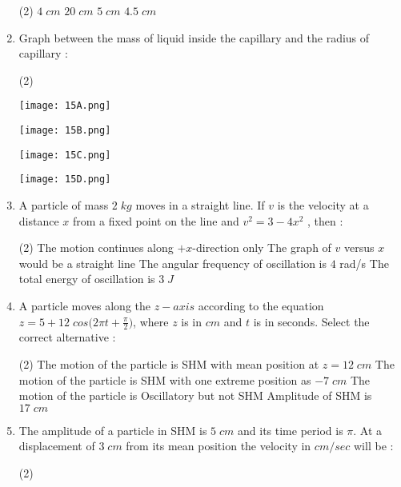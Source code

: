 \documentclass{article}
\begin{document}
\begin{enumerate}
\begin{tasks}(2)
\task \(4\;cm\)
\task \(20\;cm\)
\task \(5\;cm\)
\task \(4.5\; cm\)
\end{tasks}
\item Graph between the mass of liquid inside the capillary and the radius of capillary :
\begin{tasks}(2)
\task \begin{minipage} {0.25\textwidth} \texttt{[image: 15A.png]}\end{minipage}
\task \begin{minipage} {0.25\textwidth} \texttt{[image: 15B.png]}\end{minipage}
\task \begin{minipage} {0.25\textwidth} \texttt{[image: 15C.png]}\end{minipage}
\task \begin{minipage} {0.25\textwidth} \texttt{[image: 15D.png]}\end{minipage}
\end{tasks}
\item A particle of mass \(2\;kg\) moves in a straight line. If \(v\) is the velocity at a distance \(x\) from a fixed point on the line and \(v^2 = 3 - 4 x^2\) , then :
\begin{tasks}(2)
\task The motion continues along \(+x\)-direction only
\task The graph of \(v\) versus \(x\) would be a straight line
\task The angular frequency of oscillation is \(4\) rad/s
\task The total energy of oscillation is \(3\;J\)
\end{tasks}
\item A particle moves along the \(z-axis\) according to the equation \(z=5+12\;cos\biggl(2\pi t + \displaystyle \frac{\pi}{2}\biggl)\), where \(z\) is in \(cm\) and \(t\) is in seconds. Select the correct alternative :
\begin{tasks}(2)
\task The motion of the particle is SHM with mean position at \(z = 12\;cm\)
\task The motion of the particle is SHM with one extreme position as \(-7\;cm\)
\task The motion of the particle is Oscillatory but not SHM
\task Amplitude of SHM is \(17\;cm\)
\end{tasks}
\item The amplitude of a particle in SHM is \(5\;cm\) and its time period is \(\pi\). At a displacement of \(3\;cm\) from its mean position the velocity in \(cm/sec\) will be :
\begin{tasks}(2)

\end{tasks}
\end{enumerate}
\end{document}

